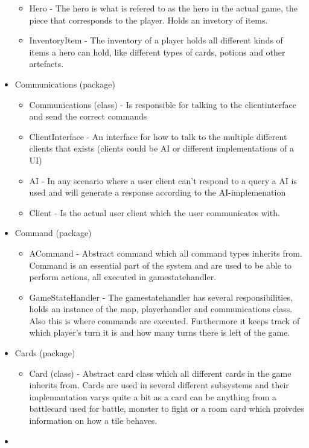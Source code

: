 \begin{itemize}
\begin{itemize}
	\item
	Hero - The hero is what is refered to as the hero in the actual game, the piece that corresponds to the player. Holds an invetory of items.
	\item
	InventoryItem - The inventory of a player holds all different kinds of items a hero can hold, like different types of cards, potions and other artefacts. 
	\end{itemize}
\item
Communications (package)
	\begin{itemize}
	\item
	Communications (class) - Is responsible for talking to the clientinterface and send the correct commands   
	\item
	ClientInterface - An interface for how to talk to the multiple different clients that exists (clients could be AI or different implementations of a UI)
	\item
	AI - In any scenario where a user client can't respond to a query a AI is used and will generate a response according to the AI-implemenation     
	\item
	Client - Is the actual user client which the user communicates with.
	\end{itemize}
\item
Command (package)
	\begin{itemize}
	\item
	ACommand - Abstract command which all command types inherits from. Command is an essential part of the system and are used to be able to perform actions, all executed in gamestatehandler.   
	\item
	GameStateHandler - The gamestatehandler has several responsibilities, holds an instance of the map, playerhandler and communications class. Also this is where
commands are executed. Furthermore it keeps track of which player's turn it is and how many turns there is left of the game. 
	\end{itemize}
\item
Cards (package)
	\begin{itemize}
	\item
	Card (class) - Abstract card class which all different cards in the game inherits from. Cards are used in several different subsystems and their implemantation varys quite a bit as a card can be anything from a battlecard used for battle, monster to fight or a room card which proivdes information on how a tile behaves.   
	\end{itemize}
\item
\end{itemize}
